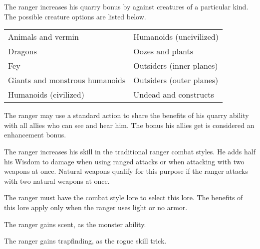  The ranger increases his quarry bonus by  against creatures of a particular kind. The possible creature options are listed below.

\begin{dtable}
\begin{tabularx}{\columnwidth}{X X}
Animals and vermin & Humanoids (uncivilized) \\
Dragons & Oozes and plants \\
Fey & Outsiders (inner planes) \\
Giants and monstrous humanoids & Outsiders (outer planes) \\
Humanoids (civilized)  & Undead and constructs \\
\end{tabularx}
\end{dtable}

 The ranger may use a standard action to share the benefits of his quarry ability with all allies who can see and hear him. The bonus his allies get is considered an enhancement bonus.

 The ranger increases his skill in the traditional ranger combat styles. He adds half his Wisdom to damage when using ranged attacks or when attacking with two weapons at once. Natural weapons qualify for this purpose if the ranger attacks with two natural weapons at once.

The ranger must have the combat style lore to select this lore. The benefits of this lore apply only when the ranger uses light or no armor.

 The ranger gains scent, as the monster ability.

 The ranger gains trapfinding, as the rogue skill trick.

\begin{comment}
\cf{Rgr}{Animal Companion (Ex)}:  At 4th level, a ranger gains an animal
companion selected from the following list: badger, camel, dire rat,
dog, riding dog, eagle, hawk, horse (light or heavy), owl, pony, snake
(Small or Medium viper), or wolf. If the campaign takes place
wholly or partly in an aquatic environment, the following creatures may be added
to the ranger's list of options: crocodile,
porpoise, Medium shark, and squid. This animal is a loyal
companion that accompanies the ranger on his adventures as
appropriate for its kind.

\par This ability functions like the druid ability of the same name (see \pref{Drd:Animal Companion (Ex)}), except that the ranger's effective druid level is equal to his ranger level \sub 3.
\par For example, the animal companion of an 8th-level
ranger would be the equivalent of a 5th-level druid's animal
companion.
\end{comment}

